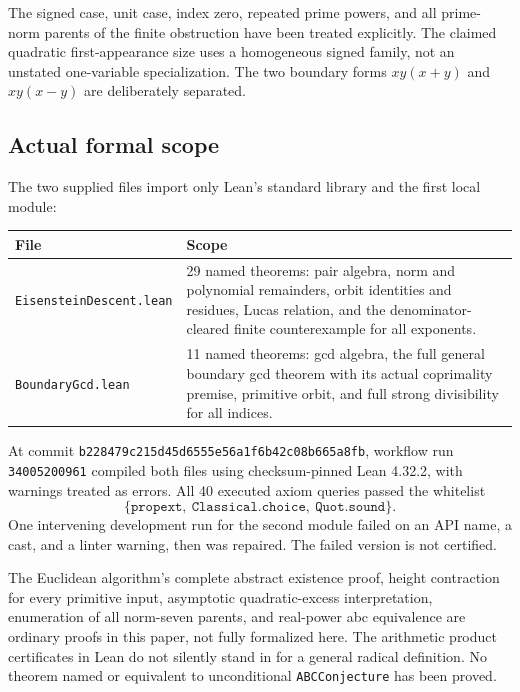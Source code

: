 \documentclass[11pt]{article}
\theoremstyle{definition}
\theoremstyle{remark}
\begin{document}
The signed case, unit case, index zero, repeated prime powers, and all prime-norm parents of the finite obstruction have been treated explicitly. The claimed quadratic first-appearance size uses a homogeneous signed family, not an unstated one-variable specialization. The two boundary forms $xy(x+y)$ and $xy(x-y)$ are deliberately separated.

\subsection{Actual formal scope}
The two supplied files import only Lean's standard library and the first local module:
\begin{center}
\begin{tabular}{@{}p{}p{}@{}}
\toprule
File & Scope\\\midrule
\texttt{EisensteinDescent.lean} & 29 named theorems: pair algebra, norm and polynomial remainders, orbit identities and residues, Lucas relation, and the denominator-cleared finite counterexample for all exponents.\\[3pt]
\texttt{BoundaryGcd.lean} & 11 named theorems: gcd algebra, the full general boundary gcd theorem with its actual coprimality premise, primitive orbit, and full strong divisibility for all indices.\\\bottomrule
\end{tabular}
\end{center}
At commit \texttt{b228479c215d45d6555e56a1f6b42c08b665a8fb}, workflow run \texttt{34005200961} compiled both files using checksum-pinned Lean 4.32.2, with warnings treated as errors. All 40 executed axiom queries passed the whitelist
\[
\{\texttt{propext},\ \texttt{Classical.choice},\ \texttt{Quot.sound}\}.
\]
One intervening development run for the second module failed on an API name, a cast, and a linter warning, then was repaired. The failed version is not certified.

The Euclidean algorithm's complete abstract existence proof, height contraction for every primitive input, asymptotic quadratic-excess interpretation, enumeration of all norm-seven parents, and real-power abc equivalence are ordinary proofs in this paper, not fully formalized here. The arithmetic product certificates in Lean do not silently stand in for a general radical definition. No theorem named or equivalent to unconditional \texttt{ABCConjecture} has been proved.
\end{document}
